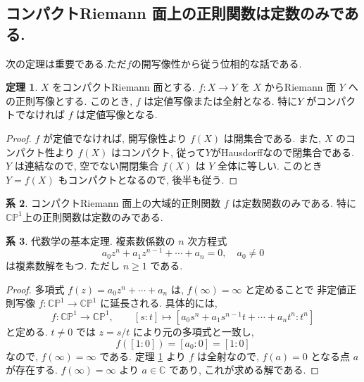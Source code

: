 \documentclass[dvipdfmx,a4paper,11pt]{article} %
\newcommand{\C}{\mathbb{C}}
\theoremstyle{definition}
\newtheorem{thm}{定理}[section]
\numberwithin{equation}{section}
\newtheorem{cor}[thm]{系}
\begin{document}
\subsection{コンパクトRiemann 面上の正則関数は定数のみである.}\label{O-S016}


次の定理は重要である.ただ$f$の開写像性から従う位相的な話である. 

\begin{thm}\label{O-M066}
$X$ をコンパクトRiemann 面とする. $f:X\to Y$ を $X$ からRiemann 面 $Y$ への正則写像とする. このとき, $f$ は定値写像または全射となる. 特に$Y$ がコンパクトでなければ $f$ は定値写像となる.
\end{thm}

\begin{proof}
$f$ が定値でなければ, 開写像性より $f(X)$ は開集合である.
また, $X$ のコンパクト性より $f(X)$ はコンパクト, 従って$Y$がHausdorffなので閉集合である.
$Y$ は連結なので, 空でない開閉集合 $f(X)$ は $Y$ 全体に等しい.
このとき $Y=f(X)$ もコンパクトとなるので, 後半も従う.
\end{proof}

\begin{cor}\label{O-M067}
コンパクトRiemann 面上の大域的正則関数 $f$ は定数関数のみである.
特に$\C\mathbb P^1$上の正則関数は定数のみである. 
\end{cor}

\begin{cor}\label{O-M068}
代数学の基本定理. 複素数係数の $n$ 次方程式
\begin{equation}
\label{O-EQ016}
a_0z^n+a_1z^{n-1}+\cdots+a_n=0,\quad a_0\neq 0
\end{equation}
は複素数解をもつ. ただし $n\geq 1$ である.
\end{cor}

\begin{proof}
多項式 $f(z)=a_0z^n+\cdots+a_n$ は, $f(\infty)=\infty$ と定めることで
非定値正則写像 $f:\C\mathbb P^1\to\C\mathbb P^1$ に延長される.
具体的には, 
\[
f:\C\mathbb P^1\to\C\mathbb P^1,\qquad
[s:t]\longmapsto
[a_0s^n+a_1s^{n-1}t+\cdots+a_nt^n:t^n]
\]
と定める.
$t\neq0$ では $z=s/t$ により元の多項式と一致し, 
\[
f([1:0])=[a_0:0]=[1:0]
\]
なので, $f(\infty)=\infty$ である.
定理 \ref{O-M066} より $f$ は全射なので, $f(a)=0$ となる点 $a$ が存在する.
$f(\infty)=\infty$ より $a\in\C$ であり, これが求める解である.
\end{proof}
\end{document}
